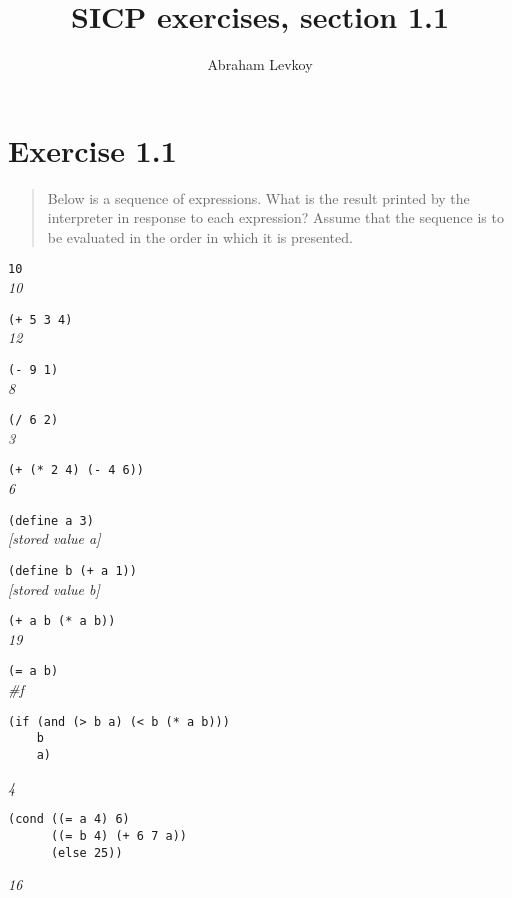 \documentclass{article}
\author{Abraham Levkoy}
\title{SICP exercises, section 1.1}
\begin{document}
\maketitle


\section{Exercise 1.1}

\begin{quote}
    Below is a sequence of expressions. What is the result printed by the
    interpreter in response to each expression? Assume that the sequence is to
    be evaluated in the order in which it is presented.
\end{quote}

\noindent \lstinline|10| \\
\emph{10}

\noindent \lstinline|(+ 5 3 4)| \\
\emph{12}

\noindent \lstinline|(- 9 1)| \\
\emph{8}

\noindent \lstinline|(/ 6 2)| \\
\emph{3}

\noindent \lstinline|(+ (* 2 4) (- 4 6))| \\
\emph{6}

\noindent \lstinline|(define a 3)| \\
\emph{[stored value a]}

\noindent \lstinline|(define b (+ a 1))| \\
\emph{[stored value b]}

\noindent \lstinline|(+ a b (* a b))| \\
\emph{19}

\noindent \lstinline|(= a b)| \\
\emph{\#f}

\begin{lstlisting}
(if (and (> b a) (< b (* a b)))
    b
    a)
\end{lstlisting}
\emph{4}

\begin{lstlisting}
(cond ((= a 4) 6)
      ((= b 4) (+ 6 7 a))
      (else 25))
\end{lstlisting}
\emph{16}
\end{document}
